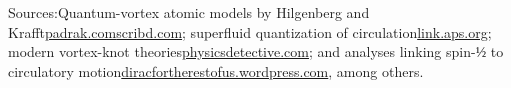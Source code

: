 Sources:Quantum-vortex atomic models by Hilgenberg and Krafft\href{https://www.padrak.com/ine/RS_REF9.html#:~:text=Matter,out%20energy%20and%20ether%2Fspace%20at}{padrak.com}\href{https://www.scribd.com/document/310197123/Ether-and-Mater-by-Carl-Krafft-pdf#:~:text=There%20are%20no%20such%20inherent,difficulties%20in%20accounting%20for}{scribd.com}; superfluid quantization of circulation\href{https://link.aps.org/doi/10.1103/PhysRevResearch.3.033009#:~:text=Superfluid%20vortices%20are%20quantum%20excitations,Based%20on%20various}{link.aps.org}; modern vortex-knot theories\href{https://physicsdetective.com/how-pair-production-works/#:~:text=,Image%E2%80%9C}{physicsdetective.com}; and analyses linking spin-$½$ to circulatory motion\href{https://diracfortherestofus.wordpress.com/2018/06/05/12-zitterwebegung/#:~:text=direction%20of%20the%20electron%20spin,intrinsic%20magnetic%20moment%20of%20the}{diracfortherestofus.wordpress.com}, among others.






